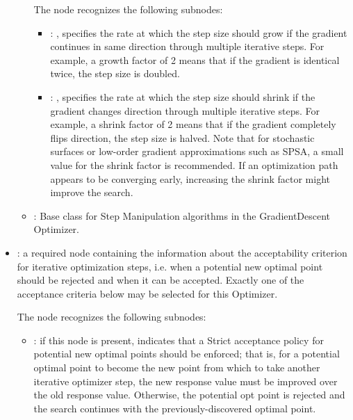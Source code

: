 \begin{itemize}
\begin{itemize}
          The  node recognizes the following subnodes:
          \begin{itemize}
            \item {}: ,
              specifies the rate at which the step size should grow if the gradient continues in
              same direction through multiple iterative steps. For example, a growth factor of 2
              means               that if the gradient is identical twice, the step size is doubled.

            \item {}: ,
              specifies the rate at which the step size should shrink if the gradient changes
              direction through multiple iterative steps. For example, a shrink factor of 2 means
              that if the gradient completely flips direction, the step size is halved. Note that
              for               stochastic surfaces or low-order gradient approximations such as
              SPSA, a small value               for the shrink factor is recommended. If an
              optimization path appears to be converging               early, increasing the shrink
              factor might improve the search. 
          \end{itemize}

        \item {}:
          Base class for Step Manipulation algorithms in the GradientDescent Optimizer.
      \end{itemize}

    \item {}:
      a required node containing the information about the acceptability criterion for iterative
      optimization steps, i.e. when a potential new optimal point should be rejected and when
      it can be accepted. Exactly one of the acceptance criteria               below may be selected
      for this Optimizer.

      The  node recognizes the following subnodes:
      \begin{itemize}
        \item {}:
          if this node is present, indicates that a Strict acceptance policy for         potential
          new optimal points should be enforced; that is, for a potential optimal point to
          become the new point from which to take another iterative optimizer step, the new response
          value         must be improved over the old response value. Otherwise, the potential opt
          point is rejected         and the search continues with the previously-discovered optimal
          point.
      \end{itemize}


\end{itemize}

